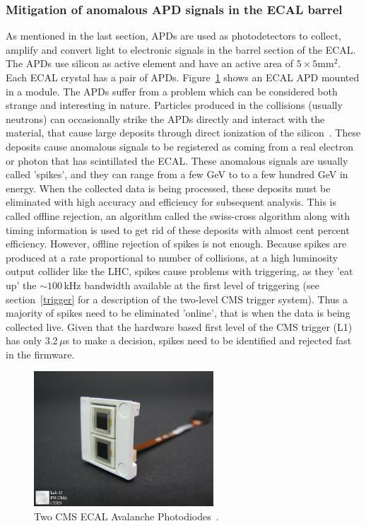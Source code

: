 \subsubsection{Mitigation of anomalous APD signals in the ECAL barrel}
As mentioned in the last section, APDs are used as photodetectors to collect, amplify and convert light to electronic signals in the barrel section of the ECAL. The APDs use silicon as active element and have an active area of $5\times5\mathrm{mm}^2$. Each ECAL crystal has a pair of APDs. Figure~\ref{fig:apd} shows an ECAL APD mounted in a module. The APDs suffer from a problem which can be considered both strange and interesting in nature. Particles produced in the collisions (usually neutrons) can occasionally strike the APDs directly and interact with the material, that cause large deposits through direct ionization of the silicon~\cite{petyt}. These deposits cause anomalous signals to be registered as coming from a real electron or photon that has scintillated the ECAL. These anomalous signals are usually called 'spikes', and they can range from a few GeV to to a few hundred GeV in energy. When the collected data is being processed, these  deposits must be eliminated with high accuracy and efficiency for subsequent analysis. This is called offline rejection, an algorithm called the swiss-cross algorithm along with timing information is used to get rid of these deposits with almost cent percent efficiency. However, offline rejection of spikes is not enough. Because spikes are produced at a rate proportional to number of collisions, at a high luminosity output collider like the LHC, spikes cause problems with triggering, as they 'eat up' the $\sim100\,$kHz bandwidth available at the first level of triggering (see section~\ref{trigger} for a description of the two-level CMS trigger system). Thus a majority of spikes need to be eliminated 'online', that is when the data is being collected live. Given that the hardware based first level of the CMS trigger (L1) has only 3.2\,$\mu$s to make a decision, spikes need to be identified and rejected fast in the firmware.     

\begin{figure}
\begin{center}
  \includegraphics[width=0.6\textwidth,keepaspectratio]{plots_and_figures/chapter3/apd.jpg}
\caption{Two CMS ECAL Avalanche Photodiodes~\cite{apd}.}
\label{fig:apd}
\end{center}
\end{figure}

